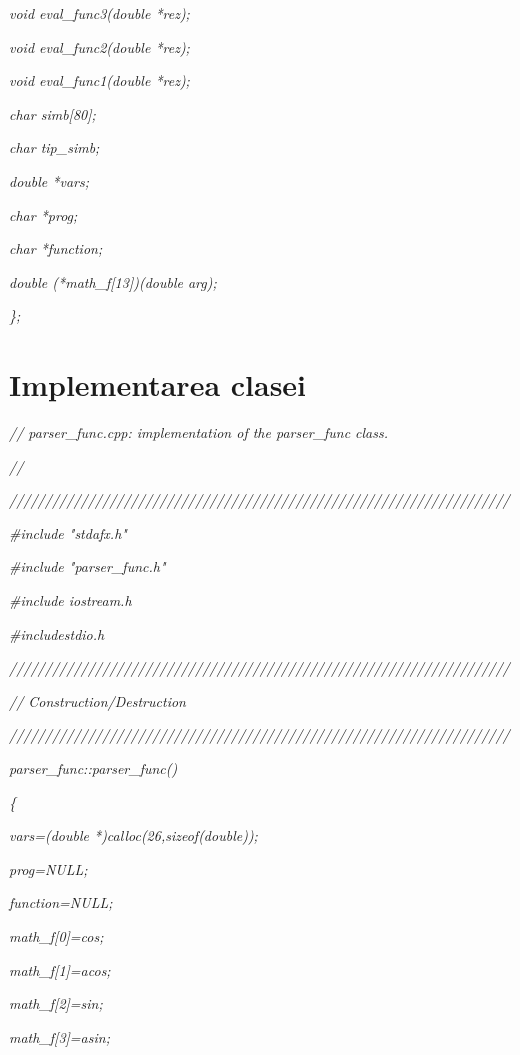\documentclass[a4paper,twoside]{book}
\begin{document}
\textit{\qquad void eval\_func3(double *rez);}

\textit{\qquad void eval\_func2(double *rez);}

\textit{\qquad void eval\_func1(double *rez);}

\textit{\qquad char simb[80];}

\textit{\qquad char tip\_simb;}

\textit{\qquad double *vars;}

\textit{\qquad char *prog;}

\textit{\qquad char *function;}

\textit{\qquad double (*math\_f[13])(double arg);}

\textit{\};}

\section{Implementarea clasei}

\textit{// parser\_func.cpp: implementation of the parser\_func class.}

\textit{//}

\textit{%
//////////////////////////////////////////////////////////////////////}

\textit{\#include "stdafx.h"}

\textit{\#include "parser\_func.h"}

\textit{\#include \TEXTsymbol{<}iostream.h\TEXTsymbol{>}}

\textit{\#include\TEXTsymbol{<}stdio.h\TEXTsymbol{>}}

\textit{%
//////////////////////////////////////////////////////////////////////}

\textit{// Construction/Destruction}

\textit{%
//////////////////////////////////////////////////////////////////////}

\textit{parser\_func::parser\_func()}

\textit{\{}

\textit{\qquad vars=(double *)calloc(26,sizeof(double));}

\textit{\qquad prog=NULL;}

\textit{\qquad function=NULL;}

\textit{\qquad math\_f[0]=cos;}

\textit{\qquad math\_f[1]=acos;}

\textit{\qquad math\_f[2]=sin;}

\textit{\qquad math\_f[3]=asin;}
\end{document}
